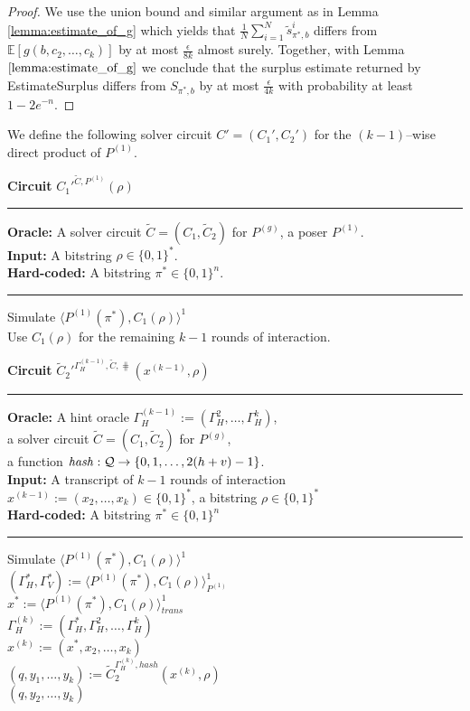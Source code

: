 \begin{proof}
We use the union bound and similar argument as in Lemma \ref{lemma:estimate_of_g}
which yields that $\frac{1}{N} \sum_{i=1}^{N} \widetilde{s}_{\pi^*,b}^i$ differs from
$\mathbb{E}[g(b, c_2, \dots, c_k)]$ by at most $\frac{\epsilon}{8k}$ almost surely. Together, with Lemma $\ref{lemma:estimate_of_g}$ we conclude that the surplus estimate
returned by EstimateSurplus differs from $S_{\pi^*,b}$ by at most $\frac{\epsilon}{4k}$ with probability at least $1 - 2e^{-n}$.
\end{proof}
%
We define the following solver circuit $C' = (C_1', C_2')$ for the $(k-1)$--wise direct product of $P^{(1)}$.
\begin{codeblock}
  \textbf{Circuit} $C_1'^{\widetilde{C}, P^{(1)}}(\rho)$
  \medskip \hrule
  \textbf{Oracle:} A solver circuit $\widetilde{C} = (C_1, \widetilde{C}_2)$ for $P^{(g)}$, a poser $P^{(1)}$. \\
  \textbf{Input:}  A bitstring $\rho \in \{0,1\}^{*}$. \\
  \textbf{Hard-coded:} A bitstring $\pi^* \in \{0,1\}^{n}$.
  \medskip\hrule
  Simulate $\langle P^{(1)}(\pi^*), C_1(\rho)\rangle^1$ \\
  Use $C_1(\rho)$ for the remaining $k-1$ rounds of interaction.
\end{codeblock}
%
\begin{codeblock}
  \textbf{Circuit} $\widetilde{C}_2'^{\Gamma_H^{(k-1)}, \widetilde{C}, \hash}(x^{(k-1)}, \rho)$
  \medskip \hrule
  \textbf{Oracle:} A hint oracle $\Gamma_H^{(k-1)} := (\Gamma_H^{2}, \dots, \Gamma_H^{k})$,\\
  \IndII a solver circuit $\widetilde{C} = (C_1, \widetilde{C}_2)$ for $P^{(g)}$, \\
  \IndII a function $\operatorname{\mathit{hash}}: \mathcal{Q} \rightarrow \{0,1,\dots, 2(h+v)-1\}$. \\
  \textbf{Input:}  A transcript of $k-1$ rounds of interaction \\
  \IndII $x^{(k-1)} := (x_2, \dotsc, x_{k}) \in \{0,1\}^{*}$, a bitstring $\rho \in \{0,1\}^{*}$\\
  \textbf{Hard-coded:} A bitstring $\pi^* \in \{0,1\}^{n}$
  \medskip\hrule
  Simulate $\langle P^{(1)}(\pi^*), C_1(\rho) \rangle^{1}$ \\
  \IndI $(\Gamma_H^*, \Gamma_V^*) := \langle P^{(1)}(\pi^*), C_1(\rho) \rangle^{1}_{P^{(1)}}$ \\
  \IndI $x^* := \langle P^{(1)}(\pi^*), C_1(\rho) \rangle^{1}_{\mathit{trans}}$ \\
  $\Gamma_H^{(k)} := (\Gamma_H^*, \Gamma_H^{2}, \dots, \Gamma_H^{k})$ \\
  $x^{(k)} := (x^*, x_2, \dots, x_{k})$ \\
  $(q, y_1, \dots, y_k) := \widetilde{C}_2^{\Gamma_H^{(k)}, \mathit{hash}}(x^{(k)}, \rho)$ \\
  \Return $(q, y_2, \dots, y_k)$
\end{codeblock}
